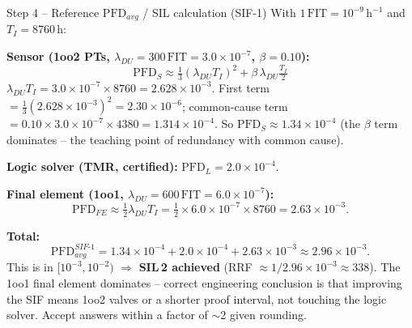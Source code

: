 \documentclass[11pt,a4paper]{article}
\begin{document}
\begin{solutionbox}{Step 4 -- Reference $\mathrm{PFD}_{avg}$ / SIL calculation (SIF-1)}
With $1\,\mathrm{FIT}=10^{-9}\,\mathrm{h}^{-1}$ and $T_I=8760\,\mathrm{h}$:

\par\vspace{1mm}
\textbf{Sensor (1oo2 PTs, $\lambda_{DU}=300\,\mathrm{FIT}=3.0\times10^{-7}$, $\beta=0.10$):}
\[
\mathrm{PFD}_S \approx \tfrac{1}{3}(\lambda_{DU}T_I)^2 + \beta\,\lambda_{DU}\tfrac{T_I}{2}
\]
$\lambda_{DU}T_I = 3.0\times10^{-7}\times8760 = 2.628\times10^{-3}$.
First term $=\tfrac13(2.628\times10^{-3})^2 = 2.30\times10^{-6}$;
common-cause term $=0.10\times3.0\times10^{-7}\times4380 = 1.314\times10^{-4}$.
So $\mathrm{PFD}_S \approx 1.34\times10^{-4}$ (the $\beta$ term dominates --
the teaching point of redundancy with common cause).

\par\vspace{1mm}
\textbf{Logic solver (TMR, certified):} $\mathrm{PFD}_L = 2.0\times10^{-4}$.

\par\vspace{1mm}
\textbf{Final element (1oo1, $\lambda_{DU}=600\,\mathrm{FIT}=6.0\times10^{-7}$):}
\[
\mathrm{PFD}_{FE} \approx \tfrac12\lambda_{DU}T_I = \tfrac12\times6.0\times10^{-7}\times8760 = 2.63\times10^{-3}.
\]

\par\vspace{1mm}
\textbf{Total:}
\[
\mathrm{PFD}_{avg}^{SIF\text{-}1} = 1.34\times10^{-4} + 2.0\times10^{-4} + 2.63\times10^{-3} \approx 2.96\times10^{-3}.
\]
This is in $[10^{-3},10^{-2})$ $\Rightarrow$ \textbf{SIL\,2 achieved}
(RRF $\approx 1/2.96\times10^{-3}\approx 338$). The 1oo1 final element
dominates -- correct engineering conclusion is that improving the SIF means
1oo2 valves or a shorter proof interval, not touching the logic solver.
Accept answers within a factor of $\sim$2 given rounding.
\end{solutionbox}
\end{document}
